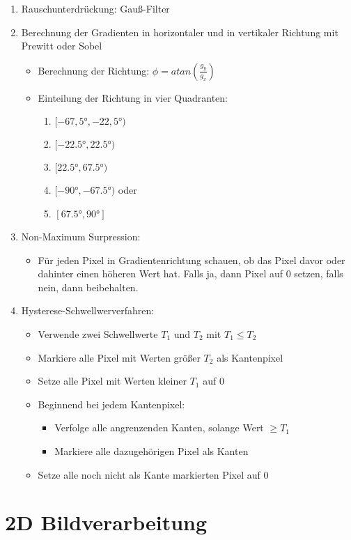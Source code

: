 \begin{enumerate}
\item Rauschunterdrückung: Gauß-Filter
\item Berechnung der Gradienten in horizontaler und in vertikaler Richtung mit Prewitt oder Sobel
	\begin{itemize}
	\item Berechnung der Richtung: $\phi=atan(\frac{g_y}{g_x})$
	\item Einteilung der Richtung in vier Quadranten:
	\begin{enumerate}
		\item $[-67,5°,-22,5°)$
		\item $[-22.5°,22.5°)$
		\item $[22.5°,67.5°)$
		\item $[-90°,-67.5°)$ oder
		\item $[67.5°,90°]$
	\end{enumerate}
	\end{itemize}
\item Non-Maximum Surpression:
	\begin{itemize}
	\item Für jeden Pixel in Gradientenrichtung schauen, ob das Pixel davor oder dahinter einen höheren Wert hat. Falls ja, dann Pixel auf 0 setzen, falls nein, dann beibehalten.
	\end{itemize}
\item Hysterese-Schwellwerverfahren:
	\begin{itemize}
	\item Verwende zwei Schwellwerte \(T_1\) und \(T_2\) mit \(T_1 \leq T_2\)
	\item Markiere alle Pixel mit Werten größer \(T_2\) als Kantenpixel
	\item Setze alle Pixel mit Werten kleiner \(T_1\) auf 0
	\item Beginnend bei jedem Kantenpixel:
		\begin{itemize}
		\item Verfolge alle angrenzenden Kanten, solange Wert \(\geq T_1\)
		\item Markiere alle dazugehörigen Pixel als Kanten
		\end{itemize}
	\item Setze alle noch nicht als Kante markierten Pixel auf 0
	\end{itemize}
\end{enumerate}


\section{2D Bildverarbeitung}

